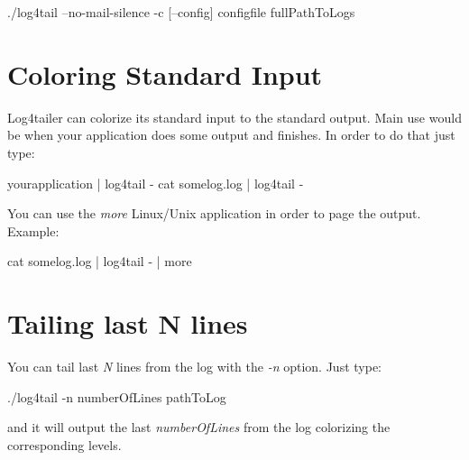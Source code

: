 \begin{cmd}
 ./log4tail --no-mail-silence -c [--config] configfile fullPathToLogs
\end{cmd}


\section{Coloring Standard Input}
Log4tailer can colorize its standard input to the standard output. Main use would be when your application 
does some output and finishes. In order to do that just type:
\begin{cmd}
 yourapplication | log4tail -
 cat somelog.log | log4tail -
\end{cmd}
You can use the \emph{more} Linux/Unix application in order to page the output. Example:
\begin{cmd}
 cat somelog.log | log4tail - | more
\end{cmd}

\section{Tailing last N lines}
You can tail last \emph{N} lines from the log with the \emph{-n} option. Just type:
\begin{cmd}
 ./log4tail -n numberOfLines pathToLog
\end{cmd}
and it will output the last \emph{numberOfLines} from the log colorizing the corresponding levels.

